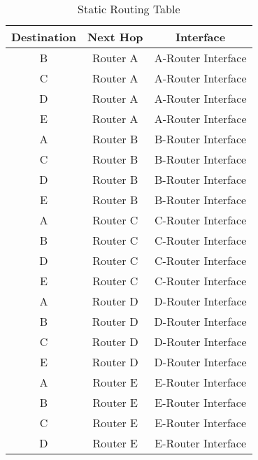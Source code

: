 \documentclass{korigamik}
\begin{document}
	\begin{table}[ht]
		\centering
		\begin{tabular}{|c|c|c|}
			\hline
			\textbf{Destination} & \textbf{Next Hop} & \textbf{Interface} \\ \hline
			B                    & Router A          & A-Router Interface \\ \hline
			C                    & Router A          & A-Router Interface \\ \hline
			D                    & Router A          & A-Router Interface \\ \hline
			E                    & Router A          & A-Router Interface \\ \hline
			A                    & Router B          & B-Router Interface \\ \hline
			C                    & Router B          & B-Router Interface \\ \hline
			D                    & Router B          & B-Router Interface \\ \hline
			E                    & Router B          & B-Router Interface \\ \hline
			A                    & Router C          & C-Router Interface \\ \hline
			B                    & Router C          & C-Router Interface \\ \hline
			D                    & Router C          & C-Router Interface \\ \hline
			E                    & Router C          & C-Router Interface \\ \hline
			A                    & Router D          & D-Router Interface \\ \hline
			B                    & Router D          & D-Router Interface \\ \hline
			C                    & Router D          & D-Router Interface \\ \hline
			E                    & Router D          & D-Router Interface \\ \hline
			A                    & Router E          & E-Router Interface \\ \hline
			B                    & Router E          & E-Router Interface \\ \hline
			C                    & Router E          & E-Router Interface \\ \hline
			D                    & Router E          & E-Router Interface \\ \hline
		\end{tabular}
		\caption{Static Routing Table}
	\end{table}
\fi
\end{document}
